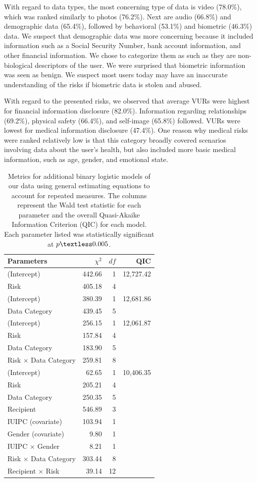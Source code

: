 \documentclass[conference]{IEEEtran}
\begin{document}
With regard to data types, the most concerning type of data is video (78.0\%), which was ranked similarly to photos (76.2\%). Next are audio (66.8\%) and demographic data (65.4\%), followed by behavioral (53.1\%) and biometric (46.3\%) data. We suspect that demographic data was more concerning because it included information such as a Social Security Number, bank account information, and other financial information. We chose to categorize them as such as they are non-biological descriptors of the user. We were surprised that biometric information was seen as  benign. We suspect most users today may have an inaccurate understanding of the risks if biometric data is stolen and abused.

With regard to the presented risks, we observed that average VURs were highest for financial information disclosure (82.0\%). Information regarding relationships (69.2\%), physical safety (66.4\%), and self-image (65.8\%) followed. VURs were lowest for medical information disclosure (47.4\%). One reason why medical risks were ranked relatively low is that this category broadly covered scenarios involving data about the user's health, but also included more basic medical information, such as age, gender, and emotional state. 


\begin{table}[t]
\centering
\begin{tabular}{|l| r| r| r|}
\hline
Parameters & $\chi^2$ & $df$ & QIC\\
\hline
\hline
(Intercept) & 442.66 & 1 & 12,727.42\\
Risk & 405.18 & 4 & \\
\hline
(Intercept) & 380.39 & 1 & 12,681.86\\
Data Category & 439.45 & 5 & \\
\hline
(Intercept) & 256.15 & 1 & 12,061.87\\
Risk & 157.84 & 4 & \\
Data Category & 183.90 & 5 & \\
Risk $\times$ Data Category & 259.81 & 8 & \\
\hline
(Intercept) & 62.65 & 1 & 10,406.35\\
Risk & 205.21 & 4 & \\
Data Category & 250.35 & 5 & \\
Recipient & 546.89 & 3 & \\
IUIPC (covariate) & 103.94 & 1 & \\
Gender (covariate) & 9.80 & 1 & \\
IUIPC $\times$ Gender & 8.21 & 1 & \\
Risk $\times$ Data Category & 303.44 & 8 & \\
Recipient $\times$ Risk & 39.14 & 12 & \\
\hline
\end{tabular}
\caption{Metrics for additional binary logistic models of our data using general estimating equations to account for repeated measures. The columns represent the Wald test statistic for each parameter and the overall Quasi-Akaike Information Criterion (QIC) for each model. Each parameter listed was statistically significant at $p\textless0.005$.}
\label{regression2}
\end{table}
\end{document}
